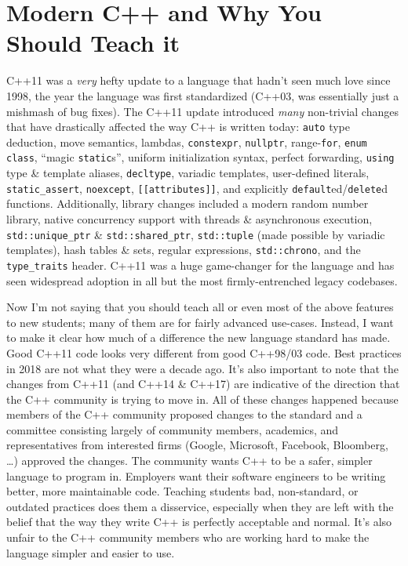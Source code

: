 \documentclass{article}
\begin{document}
\section*{Modern C++ and Why You Should Teach it}
C++11 was a \emph{very} hefty update to a language that hadn't seen much love since 1998, the year the language was first standardized (C++03, was essentially just a mishmash of bug fixes).  The C++11 update introduced \emph{many} non-trivial changes that have drastically affected the way C++ is written today:  \lstinline{auto} type deduction, move semantics, lambdas, \lstinline{constexpr}, \lstinline{nullptr}, range-\lstinline{for}, \lstinline{enum class}, ``magic \lstinline{static}s'', uniform initialization syntax, perfect forwarding, \lstinline{using} type \& template aliases, \lstinline{decltype}, variadic templates, user-defined literals, \lstinline{static_assert}, \lstinline{noexcept}, \lstinline{[[attributes]]}, and explicitly \lstinline{default}ed/\lstinline{delete}d functions.  Additionally, library changes included a modern random number library, native concurrency support with threads \& asynchronous execution, \lstinline{std::unique_ptr} \& \lstinline{std::shared_ptr}, \lstinline{std::tuple} (made possible by variadic templates), hash tables \& sets, regular expressions, \lstinline{std::chrono}, and the \lstinline{type_traits} header.  C++11 was a huge game-changer for the language and has seen widespread adoption in all but the most firmly-entrenched legacy codebases.

Now I'm not saying that you should teach all or even most of the above features to new students; many of them are for fairly advanced use-cases.  Instead, I want to make it clear how much of a difference the new language standard has made.  Good C++11 code looks very different from good C++98/03 code.  Best practices in 2018 are not what they were a decade ago.  It's also important to note that the changes from C++11 (and C++14 \& C++17) are indicative of the direction that the C++ community is trying to move in.  All of these changes happened because members of the C++ community proposed changes to the standard and a committee consisting largely of community members, academics, and representatives from interested firms (Google, Microsoft, Facebook, Bloomberg, \ldots) approved the changes.  The community wants C++ to be a safer, simpler language to program in.  Employers want their software engineers to be writing better, more maintainable code.  Teaching students bad, non-standard, or outdated practices does them a disservice, especially when they are left with the belief that the way they write C++ is perfectly acceptable and normal.  It's also unfair to the C++ community members who are working hard to make the language simpler and easier to use.
\end{document}
